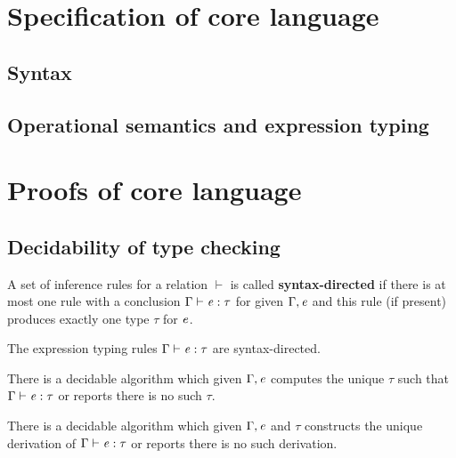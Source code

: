\section{Specification of core language}

\subsection{Syntax}
\gram{\otte\ottinterrule
        \otts\ottinterrule
        \ottG\ottinterrule
        \ottv}

\subsection{Operational semantics and expression typing}
\ottdefnstep{}
\ottusedrule{\ottdruleSXXMu{}}
\ottdefnexpr{}
\ottusedrule{\ottdruleTXXMu{}}

\section{Proofs of core language}
\subsection{Decidability of type checking}
\begin{dfn}
A set of inference rules for a relation $ \vdash $ is called \textbf{syntax-directed} if there is at most one rule with a conclusion $\Gamma  \vdash  \mathit{e}  :  \tau$ for given $\Gamma,\mathit{e}$ and this rule (if present) produces exactly one type $\tau$ for $\mathit{e}$.
\end{dfn}

\begin{lem}
The expression typing rules $\Gamma  \vdash  \mathit{e}  :  \tau$ are syntax-directed.
\end{lem}

\begin{lem}
There is a decidable algorithm which given $\Gamma, \mathit{e}$ computes the unique $\tau$ such that $\Gamma  \vdash  \mathit{e}  :  \tau$ or reports there is no such $\tau$.
\end{lem}

\begin{lem}
There is a decidable algorithm which given $\Gamma, \mathit{e}$ and $\tau$ constructs the unique derivation of $\Gamma  \vdash  \mathit{e}  :  \tau$ or reports there is no such derivation.
\end{lem}

